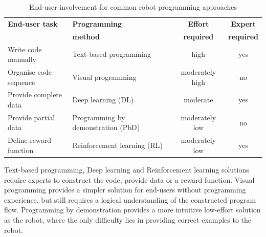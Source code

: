 \begin{table}[ht]
	\centering
	\label{tab:enduserinvolvement}
	\begin{tabular}{llcc}
		\textbf{End-user task} & \textbf{Programming}   & \textbf{Effort} & \textbf{Expert} \\
		\textbf{}& \textbf{method}   & \textbf{ required} & \textbf{ required} \\ \hline
		Write code manually    & Text-based programming       & high                          & yes                      \\
		Organise code sequence & Visual programming           & moderately high               & no                       \\
		Provide complete data  & Deep learning (DL)               & moderate                      & yes                      \\
		Provide partial data   & Programming by demonstration (PbD) & moderately low                & no                       \\
		Define reward function & Reinforcement learning (RL)      & moderately low                & yes                     
	\end{tabular}
\caption{End-user involvement for common robot programming approaches}
\end{table}

Text-based programming, Deep learning and Reinforcement learning solutions require experts to construct the code, provide data or a reward function. Visual programming provides a simpler solution for end-users without programming experience, but still requires a logical understanding of the constructed program flow. Programming by demonstration provides a more intuitive low-effort solution as the robot, where the only difficulty lies in providing correct examples to the robot.


